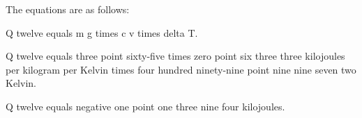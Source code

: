The equations are as follows:

Q twelve equals m g times c v times delta T.

Q twelve equals three point sixty-five times zero point six three three kilojoules per kilogram per Kelvin times four hundred ninety-nine point nine nine seven two Kelvin.

Q twelve equals negative one point one three nine four kilojoules.